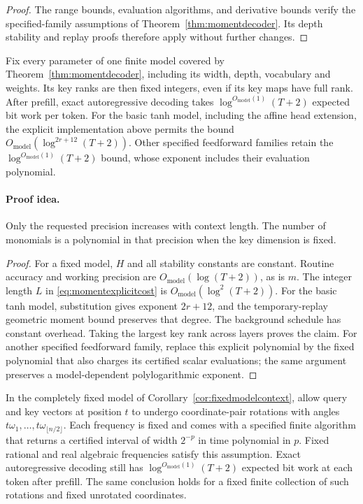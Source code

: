 \begin{proof}
The range bounds, evaluation algorithms, and derivative
bounds verify the specified-family assumptions of
Theorem~\ref{thm:momentdecoder}.  Its depth stability and
replay proofs therefore apply without further changes.
\end{proof}

\begin{corollary}
\label{cor:fixedmodelcontext}
Fix every parameter of one finite model covered by
Theorem~\ref{thm:momentdecoder}, including its width, depth,
vocabulary and weights.  Its key ranks are then fixed integers,
even if its key maps have full rank.  After prefill, exact
autoregressive decoding takes $\log^{O_{\mathrm{model}}(1)}(T+2)$ expected bit
work per token.  For the basic tanh model, including the affine
head extension, the explicit implementation above permits the
bound $O_{\mathrm{model}}(\log^{2r+12}(T+2))$.  Other specified
feedforward families retain the $\log^{O_{\mathrm{model}}(1)}(T+2)$
bound, whose exponent includes their evaluation polynomial.
\end{corollary}

\paragraph{Proof idea.}
Only the requested precision increases with context length.
The number of monomials is a polynomial in that precision when
the key dimension is fixed.

\begin{proof}
For a fixed model, $H$ and all stability constants are constant.
Routine accuracy and working precision are $O_{\mathrm{model}}
(\log(T+2))$, as is $m$.  The integer length $L$ in
\eqref{eq:momentexplicitcost} is
$O_{\mathrm{model}}(\log^2(T+2))$.  For the basic tanh model, substitution gives exponent
$2r+12$, and the temporary-replay geometric moment bound
preserves that degree.  The background schedule has constant
overhead.  Taking the largest key rank across layers proves the
claim.  For another specified feedforward family, replace this
explicit polynomial by the fixed polynomial that also charges
its certified scalar evaluations; the same argument preserves
a model-dependent polylogarithmic exponent.
\end{proof}

\begin{corollary}
\label{cor:fixedpositionalrotation}
In the completely fixed model of
Corollary~\ref{cor:fixedmodelcontext}, allow query and key vectors
at position $t$ to undergo coordinate-pair rotations with angles
$t\omega_1,\ldots,t\omega_{\lfloor n/2\rfloor}$.
Each frequency is fixed and comes with a specified finite
algorithm that returns a certified interval of width $2^{-p}$
in time polynomial in $p$.  Fixed rational and real algebraic
frequencies satisfy this assumption.  Exact autoregressive
decoding still has $\log^{O_{\mathrm{model}}(1)}(T+2)$ expected
bit work at each token after prefill.
The same conclusion holds for a fixed finite collection of such
rotations and fixed unrotated coordinates.
\end{corollary}

